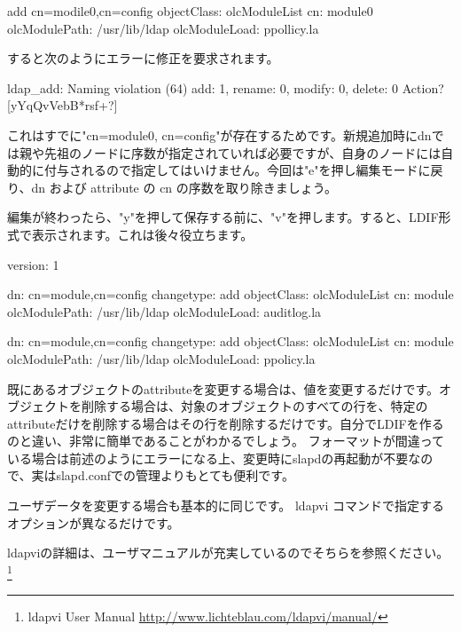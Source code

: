 \documentclass[mingoth,a4paper]{jsarticle}
\begin{document}
\begin{commandline}
add cn=modile{0},cn=config
objectClass: olcModuleList
cn: module{0}
olcModulePath: /usr/lib/ldap
olcModuleLoad: ppollicy.la
\end{commandline}

すると次のようにエラーに修正を要求されます。
\begin{commandline}
ldap_add: Naming violation (64)
add: 1, rename: 0, modify: 0, delete: 0
Action? [yYqQvVebB*rsf+?] 
\end{commandline}

これはすでに"cn=module{0}, cn=config"が存在するためです。新規追加時にdnでは親や先祖のノードに序数が指定されていれば必要ですが、自身のノードには自動的に付与されるので指定してはいけません。今回は"e"を押し編集モードに戻り、dn および attribute の cn の序数を取り除きましょう。

編集が終わったら、"y"を押して保存する前に、"v"を押します。すると、LDIF形式で表示されます。これは後々役立ちます。

\begin{commandline}
version: 1

dn: cn=module,cn=config
changetype: add
objectClass: olcModuleList
cn: module
olcModulePath: /usr/lib/ldap
olcModuleLoad: auditlog.la

dn: cn=module,cn=config
changetype: add
objectClass: olcModuleList
cn: module
olcModulePath: /usr/lib/ldap
olcModuleLoad: ppolicy.la
\end{commandline}

既にあるオブジェクトのattributeを変更する場合は、値を変更するだけです。オブジェクトを削除する場合は、対象のオブジェクトのすべての行を、特定のattributeだけを削除する場合はその行を削除するだけです。自分でLDIFを作るのと違い、非常に簡単であることがわかるでしょう。
フォーマットが間違っている場合は前述のようにエラーになる上、変更時にslapdの再起動が不要なので、実はslapd.confでの管理よりもとても便利です。

ユーザデータを変更する場合も基本的に同じです。 ldapvi コマンドで指定するオプションが異なるだけです。


ldapviの詳細は、ユーザマニュアルが充実しているのでそちらを参照ください。\footnote{ldapvi User Manual \url{http://www.lichteblau.com/ldapvi/manual/}}

\end{document}
